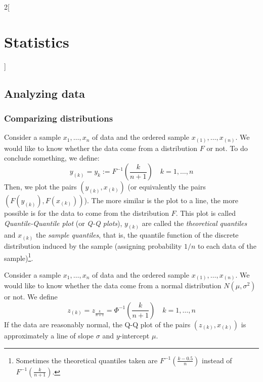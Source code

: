 \documentclass[../../../main_math.tex]{subfiles}
\begin{document}
\begin{multicols}{2}[\section{Statistics}]
  \subsection{Analyzing data}
  \subsubsection{Comparizing distributions}
  \begin{definition}[Q-Q plots]
    Consider a sample $x_1,\ldots,x_n$ of data and the ordered sample $x_{(1)},\ldots,x_{(n)}$. We would like to know whether the data come from a distribution $F$ or not. To do conclude something, we define: $$y_{(k)}=y_k:=F^{-1}\left(\frac{k}{n+1}\right)\quad k=1,\ldots,n$$
    Then, we plot the pairs $(y_{(k)},x_{(k)})$ (or equivalently the pairs $(F(y_{(k)}),F(x_{(k)}))$). The more similar is the plot to a line, the more possible is for the data to come from the distribution $F$. This plot is called \emph{Quantile-Quantile plot} (or \emph{Q-Q plots}), $y_{(k)}$ are called the \emph{theoretical quantiles} and $x_{(k)}$ the \emph{sample quantiles}, that is, the quantile function of the discrete distribution induced by the sample (assigning probability $1/n$ to each data of the sample)\footnote{Sometimes the theoretical quantiles taken are $F^{-1}\left(\frac{k-0.5}{n}\right)$ instead of $F^{-1}\left(\frac{k}{n+1}\right)$.}.
  \end{definition}
  \begin{proposition}
    Consider a sample $x_1,\ldots,x_n$ of data and the ordered sample $x_{(1)},\ldots,x_{(n)}$. We would like to know whether the data come from a normal distribution $N(\mu,\sigma^2)$ or not. We define $$z_{(k)}=z_{\frac{k}{n+1}}=\Phi^{-1}\left(\frac{k}{n+1}\right)\quad k=1,\ldots,n$$
    If the data are reasonably normal, the Q-Q plot of the pairs $(z_{(k)},x_{(k)})$ is approximately a line of slope $\sigma$ and $y$-intercept $\mu$.
  \end{proposition}
  \begin{center}
    \begin{minipage}{\linewidth}
      \centering
      
    \end{minipage}
  \end{center}
\end{multicols}
\end{document}
